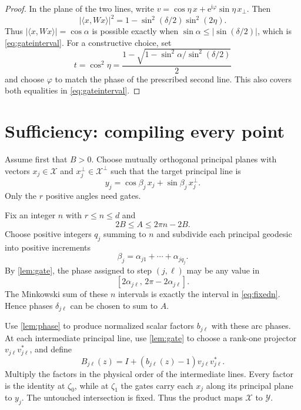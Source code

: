 \documentclass[11pt]{article}
\theoremstyle{definition}
\theoremstyle{remark}
\newcommand{\e}{\mathrm e}
\begin{document}
\begin{proof}
In the plane of the two lines, write
$v=\cos\eta\,x+\e^{\mathrm i\varphi}\sin\eta\,x_\perp$.  Then
\begin{equation}\label{eq:gateoverlap}
 |\langle x,Wx\rangle|^2
 =1-\sin^2(\delta/2)\sin^2(2\eta).
\end{equation}
Thus $|\langle x,Wx\rangle|=\cos\alpha$ is possible exactly when
$\sin\alpha\le|\sin(\delta/2)|$, which is \eqref{eq:gateinterval}.
For a constructive choice, set
\[
 t=\cos^2\eta=
 \frac{1-\sqrt{1-\sin^2\alpha/\sin^2(\delta/2)}}{2}
\]
and choose $\varphi$ to match the phase of the prescribed second line.
This also covers both equalities in \eqref{eq:gateinterval}.
\end{proof}

\section{Sufficiency: compiling every point}

Assume first that $B>0$.  Choose mutually orthogonal principal planes with
vectors $x_j\in\mathcal X$ and $x_j^\perp\in\mathcal X^\perp$ such that the
target principal line is
\[
 y_j=\cos\beta_j\,x_j+\sin\beta_j\,x_j^\perp.
\]
Only the $r$ positive angles need gates.

Fix an integer $n$ with $r\le n\le d$ and
\begin{equation}\label{eq:fixedn}
 2B\le A\le2\pi n-2B.
\end{equation}
Choose positive integers $q_j$ summing to $n$ and subdivide each principal
geodesic into positive increments
\[
 \beta_j=\alpha_{j1}+\cdots+\alpha_{jq_j}.
\]
By \cref{lem:gate}, the phase assigned to step $(j,\ell)$ may be any value
in
\[
 [2\alpha_{j\ell},\,2\pi-2\alpha_{j\ell}].
\]
The Minkowski sum of these $n$ intervals is exactly the interval in
\eqref{eq:fixedn}.  Hence phases $\delta_{j\ell}$ can be chosen to sum to
$A$.

Use \cref{lem:phase} to produce normalized scalar factors
$b_{j\ell}$ with these arc phases.  At each intermediate principal line,
use \cref{lem:gate} to choose a rank-one projector $v_{j\ell}v_{j\ell}^*$,
and define
\[
 B_{j\ell}(z)=I+(b_{j\ell}(z)-1)v_{j\ell}v_{j\ell}^*.
\]
Multiply the factors in the physical order of the intermediate lines.
Every factor is the identity at $\zeta_0$, while at $\zeta_1$ the gates
carry each $x_j$ along its principal plane to $y_j$.  The untouched
intersection is fixed.  Thus the product maps $\mathcal X$ to $\mathcal Y$.
\end{document}
